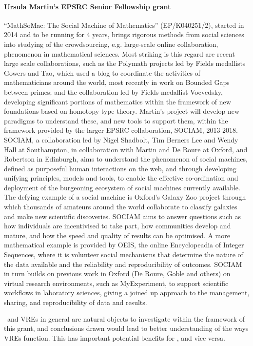 \paragraph{Ursula Martin's EPSRC Senior Fellowship grant}
``MathSoMac: The Social Machine of Mathematics'' (EP/K040251/2), started in 2014 and to be running 
for 4 years, brings rigorous methods from social
sciences into studying of the crowdsourcing, e.g. large-scale online
collaboration, phenomenon in mathematical sciences. 
 Most striking is this regard are recent large scale collaborations, such
as the Polymath projects led by Fields medallists Gowers and Tao, which used a blog to coordinate the
activities of mathematicians around the world, most recently in work on Bounded Gaps between primes; and
the collaboration led by Fields medallist Voevedsky, developing significant portions of mathematics
within the framework of new foundations based on homotopy type theory. Martin’s project will develop new
paradigms to understand these, and new tools to support them, within the framework provided by the
larger EPSRC collaboration, SOCIAM, 2013-2018. SOCIAM, a collaboration led by Nigel Shadbolt, Tim
Berners Lee and Wendy Hall at Southampton, in collaboration with Martin and De Roure at Oxford, and
Robertson in Edinburgh, aims to understand the phenomenon of social machines, defined as purposeful
human interactions on the web, and through developing unifying principles, models and tools, to enable
the effective co-ordination and deployment of the burgeoning ecosystem of social machines currently
available. The defying example of a social machine is Oxford’s Galaxy Zoo project through which
thousands of amateurs around the world collaborate to classify galaxies and make new scientific
discoveries. SOCIAM aims to answer questions such as how individuals are incentivised to take part, how
communities develop and mature, and how the speed and quality of results can be optimised. A more
mathematical example is provided by OEIS, the online Encyclopeadia of Integer Sequences, where it is
volunteer social mechanisms that determine the nature of the data available and the reliability and
reproducibility of outcomes. SOCIAM in turn builds on previous work in Oxford (De Roure, Goble and
others) on virtual research environments, such as MyExperiment, to support scientific workflows in
laboratory sciences,  giving a joined up approach to the management, sharing, and reproducibility of
data and results.

\TheProject\ and VREs in general are natural objects to investigate 
within the framework of this grant, and conclusions drawn would lead to better understanding
of the ways VREs function. This has important potential benefits for \TheProject, and
vice versa. 

